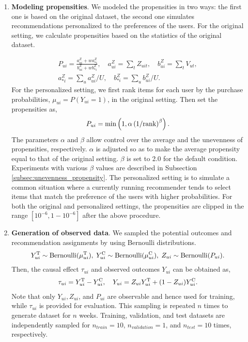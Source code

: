\documentclass[manuscript,screen]{acmart}
\begin{document}
\begin{enumerate}
	\item \textbf{Modeling propensities}.
	We modeled the propensities in two ways: the first one is based on the original dataset, the second one simulates recommendations personalized to the preferences of the users.
	For the original setting, we calculate propensities based on the statistics of the original dataset.

	\begin{equation} 
	\begin{split}
	P_{ui} = \frac{a_{ui}^Z + w a_{*i}^Z}{b_{ui}^Z + w b_{*i}^Z}, \quad
	a_{ui}^Z=\sum_t Z_{uit}, \quad
	b_{ui}^Z=\sum_t V_{ut}, \\
	a_{*i}^Z=\sum_u a_{ui}^Z/U, \quad
	b_{*i}^Z=\sum_u b_{ui}^Z/U.
	\end{split}
	\end{equation}
	For the personalized setting, we first rank items for each user by the purchase probabilities, $\mu_{ui}=P(Y_{ui}=1)$, in the original setting.
	Then set the propensities as, 
	\begin{equation}
	\label{eq:gen_propensity}
	P_{ui} = \min \left(1, \alpha \left( 1/\textnormal{rank}\right)^\beta \right).
	\end{equation}
	The parameters $\alpha$ and $\beta$ allow control over the average and the unevenness of propensities, respectively.
	$\alpha$ is adjusted so as to make the average propensity equal to that of the original setting.
	$\beta$ is set to 2.0 for the default condition.
	Experiments with various $\beta$ values are described in Subsection \ref{subsec:unevenness_propensity}.
	The personalized setting is to simulate a common situation where a currently running recommender tends to select items that match the preference of the users with higher probabilities.
	For both the original and personalized settings, the propensities are clipped in the range $[10^{-6}, 1-10^{-6}]$ after the above procedure.
	
	\item \textbf{Generation of observed data}.
	We sampled the potential outcomes and recommendation assignments by using Bernoulli distributions.
	\begin{equation}
	Y_{ui}^\textnormal{T} \sim \textnormal{Bernoulli}(\mu_{ui}^\textnormal{T}), \;
	Y_{ui}^\textnormal{C} \sim \textnormal{Bernoulli}(\mu_{ui}^\textnormal{C}), \;
	Z_{ui} \sim \textnormal{Bernoulli}(P_{ui}).
	\end{equation}
	Then, the causal effect $\tau_{ui}$ and observed outcomes $Y_{ui}$ can be obtained as,
	\begin{equation}
	\tau_{ui} = Y_{ui}^\textnormal{T} - Y_{ui}^\textnormal{C}, \quad
	Y_{ui} = Z_{ui} Y_{ui}^\textnormal{T} +(1-Z_{ui}) Y_{ui}^\textnormal{C}.
	\end{equation}
	Note that only $Y_{ui}, Z_{ui}$, and $P_{ui}$ are observable and hence used for training, while $\tau_{ui}$ is provided for evaluation.
	This sampling is repeated $n$ times to generate dataset for $n$ weeks.
	Training, validation, and test datasets are independently sampled for $n_{train}=10$, $n_{validation}=1$, and $n_{test}=10$ times, respectively.
\end{enumerate}
\end{document}
